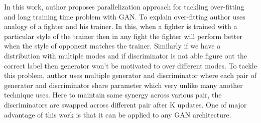 In this work, author proposes parallelization approach for tackling over-fitting and long training time problem with GAN. To explain over-fitting author uses analogy of a fighter and his trainer. In this, when a fighter is trained with a particular style of the trainer then in any fight the fighter will perform better when the style of opponent matches the trainer. Similarly if  we have a distribution with multiple modes and if discriminator is not able figure out the correct label then generator won't be motivated to over different modes. To tackle this problem, author uses multiple generator and discriminator where each pair of generator and discriminator share parameter which very unlike many another technique uses. Here to maintain same synergy across various pair, the discriminators are swapped across different pair after K updates.  One of major advantage of this work is that it can be applied to any GAN architecture.
